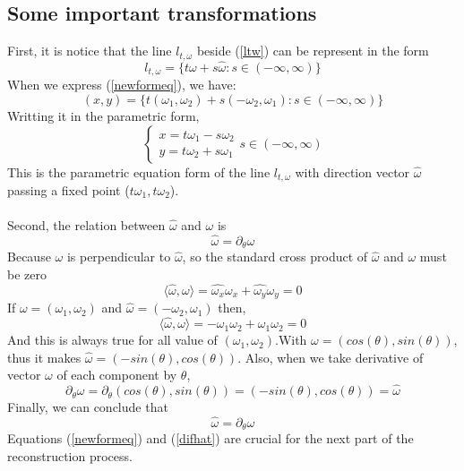 \documentclass[a4paper]{article}
\begin{document}
\subsection{Some important transformations}
First, it is notice that the line $l_{t,\omega}$ beside (\ref{ltw}) can be represent in the form
\begin{equation}\label{newformeq}
    l_{t,\omega} = \{ t\omega + s\hat{\omega}: s \in (-\infty,\infty )\} 
\end{equation}
When we express (\ref{newformeq}), we have:
\begin{equation*}
    (x,y) = \{t(\omega_1,\omega_2) + s(-\omega_2,\omega_1) : s \in (-\infty,\infty )\}
\end{equation*}
Writting it in the parametric form,
\[\begin{cases}
    x=t\omega_1 - s\omega_2\\
    y=t\omega_2 + s\omega_1
\end{cases}
s\in (-\infty,\infty)\]
This is the parametric equation form of the line $l_{t,\omega}$ with direction vector $\hat{\omega}$ passing a fixed point ($t\omega_1,t\omega_2$).\\ \\
Second, the relation between $\hat{\omega}$ and $\omega$ is
\begin{equation}\label{difhat}
    \hat{\omega} = \partial_\theta\omega 
\end{equation}
Because $\omega$ is perpendicular to $\hat{\omega}$, so the standard cross product of $\hat{\omega}$ and $\omega$ must be zero
\begin{equation*}
    \langle \hat{\omega},\omega \rangle = \hat{\omega_x}\omega_x + \hat{\omega_y}\omega_y = 0
\end{equation*}
If $\omega = (\omega_1,\omega_2)$ and $\hat{\omega} = (-\omega_2,\omega_1)$ then,
\begin{equation*}
    \langle \hat{\omega},\omega \rangle = -\omega_1\omega_2 + \omega_1\omega_2 = 0
\end{equation*}
And this is always true for all value of $(\omega_1,\omega_2)$.With $\omega = (cos(\theta),sin(\theta))$, thus it makes $\hat{\omega} = (-sin(\theta),cos(\theta))$. Also, when we take derivative of vector $\omega$ of each component by $\theta$,
\begin{equation*}
    \partial_\theta\omega = \partial_\theta(cos(\theta),sin(\theta)) = (-sin(\theta),cos(\theta)) = \hat{\omega}
\end{equation*}
Finally, we can conclude that
\begin{equation*}
    \hat{\omega} = \partial_\theta\omega 
\end{equation*}
Equations (\ref{newformeq}) and (\ref{difhat}) are crucial for the next part of the reconstruction process. 
\end{document}
